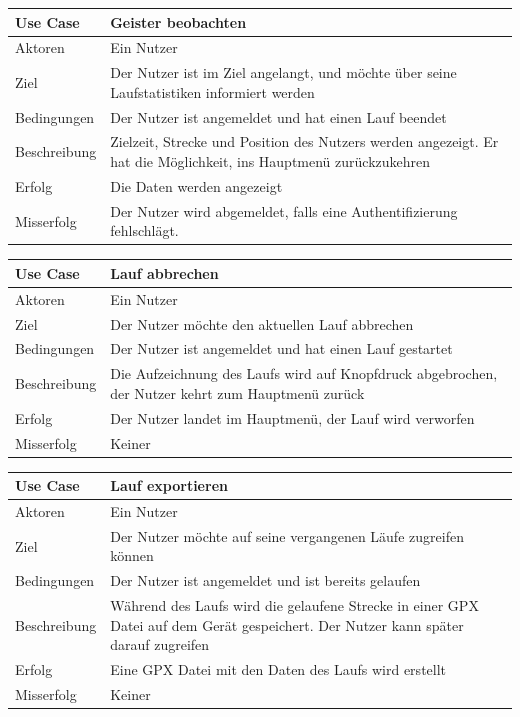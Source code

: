 \begin{tabular}{|p{}|p{}|}
\hline
\textbf{Use Case} & \textbf{Geister beobachten} \\ \hline
Aktoren &  Ein Nutzer \\ \hline
Ziel &  Der Nutzer ist im Ziel angelangt, und möchte über seine Laufstatistiken informiert werden \\ \hline
Bedingungen &  Der Nutzer ist angemeldet und hat einen Lauf beendet \\ \hline
Beschreibung & Zielzeit, Strecke und Position des Nutzers werden angezeigt. Er hat die Möglichkeit, ins Hauptmenü zurückzukehren \\ \hline
Erfolg & Die Daten werden angezeigt \\ \hline
Misserfolg & Der Nutzer wird abgemeldet, falls eine Authentifizierung fehlschlägt. \\ \hline
\hline \end{tabular}
\begin{tabular}{|p{}|p{}|}
\hline
\textbf{Use Case} & \textbf{Lauf abbrechen} \\ \hline
Aktoren &  Ein Nutzer \\ \hline
Ziel &  Der Nutzer möchte den aktuellen Lauf abbrechen \\ \hline
Bedingungen & Der Nutzer ist angemeldet und hat einen Lauf gestartet \\ \hline
Beschreibung & Die Aufzeichnung des Laufs wird auf Knopfdruck abgebrochen, der Nutzer kehrt zum Hauptmenü zurück \\ \hline
Erfolg & Der Nutzer landet im Hauptmenü, der Lauf wird verworfen \\ \hline
Misserfolg & Keiner \\ \hline
\hline \end{tabular}
\begin{tabular}{|p{}|p{}|}
\hline
\textbf{Use Case} & \textbf{Lauf exportieren} \\ \hline
Aktoren &  Ein Nutzer \\ \hline
Ziel &  Der Nutzer möchte auf seine vergangenen Läufe zugreifen können \\ \hline
Bedingungen & Der Nutzer ist angemeldet und ist bereits gelaufen \\ \hline
Beschreibung & Während des Laufs wird die gelaufene Strecke in einer GPX Datei auf dem Gerät gespeichert. Der Nutzer kann später darauf zugreifen \\ \hline
Erfolg & Eine GPX Datei mit den Daten des Laufs wird erstellt \\ \hline
Misserfolg & Keiner \\ \hline
\hline \end{tabular}
